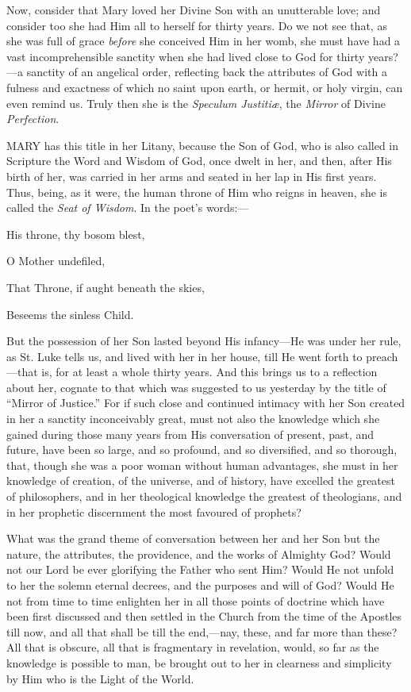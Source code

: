Now, consider that Mary loved
her Divine Son with an unutterable love; and consider too she had Him
all to herself for thirty years. Do we not see that, as she was full of
grace \emph{before} she conceived Him in her womb, she must have had a
vast incomprehensible sanctity when she had lived close to God for
thirty years?—a sanctity of an angelical order, reflecting back the
attributes of God with a fulness and exactness of which no saint upon
earth, or hermit, or holy virgin, can even remind us. Truly then she is
the \emph{Speculum Justitiæ}, the \emph{Mirror} of Divine \emph{Perfection}.



MARY
has this title in her Litany, because the Son of God, who is also called
in Scripture the Word and Wisdom of God, once dwelt in her, and then,
after His birth of her, was carried in her arms and seated in her lap in
His first years. Thus, being, as it were, the human throne of Him who
reigns in heaven, she is called the \emph{Seat of Wisdom}. In the poet's
words:—

His
throne, thy bosom blest,

O Mother undefiled,

That Throne, if aught beneath the skies,

Beseems the sinless Child.

But the possession of her Son
lasted beyond His infancy—He was under her rule, as St. Luke tells us,
and lived with her in her house, till He went forth to preach—that is,
for at least a whole thirty years. And this brings us to a reflection
about her, cognate to that which was suggested to us yesterday by
the title of ``Mirror of Justice.'' For if such close and continued
intimacy with her Son created in her a sanctity inconceivably great,
must not also the knowledge which she gained during those many years
from His conversation of present, past, and future, have been so large,
and so profound, and so diversified, and so thorough, that, though she
was a poor woman without human advantages, she must in her knowledge of
creation, of the universe, and of history, have excelled the greatest of
philosophers, and in her theological knowledge the greatest of
theologians, and in her prophetic discernment the most favoured of
prophets?

What was the grand theme of
conversation between her and her Son but the nature, the attributes, the
providence, and the works of Almighty God? Would not our Lord be ever
glorifying the Father who sent Him? Would He not unfold to her the
solemn eternal decrees, and the purposes and will of God? Would He not
from time to time enlighten her in all those points of doctrine which
have been first discussed and then settled in the Church from the time
of the Apostles till now, and all that shall be till the end,—nay,
these, and far more than these? All that is obscure, all that is
fragmentary in revelation, would, so far as the knowledge is possible to
man, be brought out to her in clearness and simplicity by Him who is the
Light of the World.

